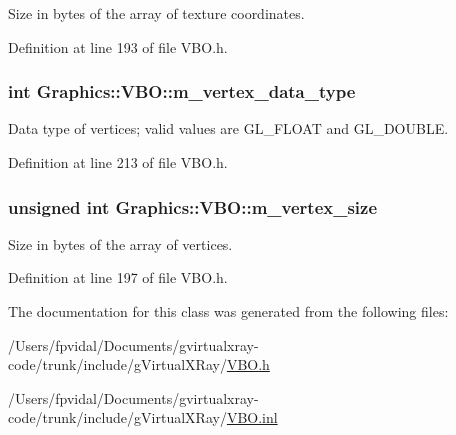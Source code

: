 Size in bytes of the array of texture coordinates. 



Definition at line 193 of file VBO.h.

\hypertarget{class_graphics_1_1_v_b_o_a5c41a622ac8a3b1a2798d8fa69d53db6}{
\subsubsection[{m\_\-vertex\_\-data\_\-type}]{\setlength{\rightskip}{0pt plus 5cm}int {\bf Graphics::VBO::m\_\-vertex\_\-data\_\-type}}}
\label{class_graphics_1_1_v_b_o_a5c41a622ac8a3b1a2798d8fa69d53db6}


Data type of vertices; valid values are GL\_\-FLOAT and GL\_\-DOUBLE. 



Definition at line 213 of file VBO.h.

\hypertarget{class_graphics_1_1_v_b_o_a22a4fa87cd40138f131e8dc3e604053c}{
\subsubsection[{m\_\-vertex\_\-size}]{\setlength{\rightskip}{0pt plus 5cm}unsigned int {\bf Graphics::VBO::m\_\-vertex\_\-size}}}
\label{class_graphics_1_1_v_b_o_a22a4fa87cd40138f131e8dc3e604053c}


Size in bytes of the array of vertices. 



Definition at line 197 of file VBO.h.



The documentation for this class was generated from the following files:\begin{DoxyCompactItemize}
\item 
/Users/fpvidal/Documents/gvirtualxray-\/code/trunk/include/gVirtualXRay/\hyperlink{_v_b_o_8h}{VBO.h}\item 
/Users/fpvidal/Documents/gvirtualxray-\/code/trunk/include/gVirtualXRay/\hyperlink{_v_b_o_8inl}{VBO.inl}\end{DoxyCompactItemize}
